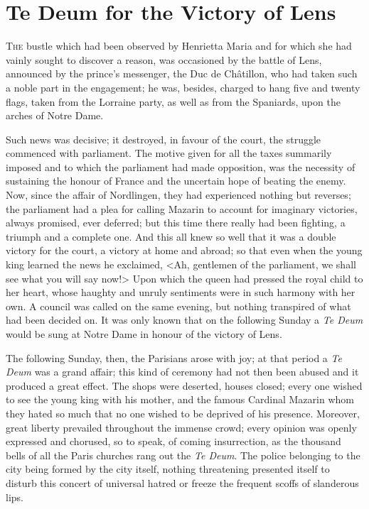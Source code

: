 \chapter{Te Deum for the Victory of Lens}

 \lettrine{T}{he} bustle which had been observed by Henrietta Maria and for which she had vainly sought to discover a reason, was occasioned by the battle of Lens, announced by the prince's messenger, the Duc de Châtillon, who had taken such a noble part in the engagement; he was, besides, charged to hang five and twenty flags, taken from the Lorraine party, as well as from the Spaniards, upon the arches of Notre Dame.

Such news was decisive; it destroyed, in favour of the court, the struggle commenced with parliament. The motive given for all the taxes summarily imposed and to which the parliament had made opposition, was the necessity of sustaining the honour of France and the uncertain hope of beating the enemy. Now, since the affair of Nordlingen, they had experienced nothing but reverses; the parliament had a plea for calling Mazarin to account for imaginary victories, always promised, ever deferred; but this time there really had been fighting, a triumph and a complete one. And this all knew so well that it was a double victory for the court, a victory at home and abroad; so that even when the young king learned the news he exclaimed, <Ah, gentlemen of the parliament, we shall see what you will say now!> Upon which the queen had pressed the royal child to her heart, whose haughty and unruly sentiments were in such harmony with her own. A council was called on the same evening, but nothing transpired of what had been decided on. It was only known that on the following Sunday a \textit{Te Deum} would be sung at Notre Dame in honour of the victory of Lens.

The following Sunday, then, the Parisians arose with joy; at that period a \textit{Te Deum} was a grand affair; this kind of ceremony had not then been abused and it produced a great effect. The shops were deserted, houses closed; every one wished to see the young king with his mother, and the famous Cardinal Mazarin whom they hated so much that no one wished to be deprived of his presence. Moreover, great liberty prevailed throughout the immense crowd; every opinion was openly expressed and chorused, so to speak, of coming insurrection, as the thousand bells of all the Paris churches rang out the \textit{Te Deum}. The police belonging to the city being formed by the city itself, nothing threatening presented itself to disturb this concert of universal hatred or freeze the frequent scoffs of slanderous lips.

